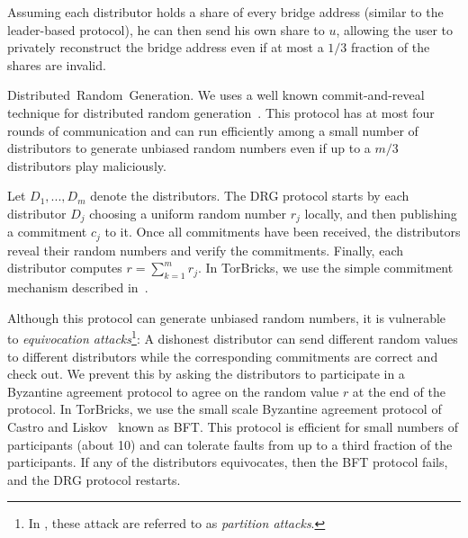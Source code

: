 \documentclass[USenglish,oneside,twocolumn]{article}
\newcommand{\bricks}{}
\def\bricks/{\textsf{\sfsize \mbox{TorBricks}}}
\newcommand{\sfsize}{\fontsize{0.68\baselineskip}{0.68\baselineskip}\selectfont}
\newcommand{\sans}[1]{\textsf{\sfsize \mbox{#1}}}
\newcommand{\para}[1]{\vspace{0.85em} \noindent \sans{{\mbox{#1}}}}
\begin{document}
Assuming each distributor holds a share of every bridge address (similar to the leader-based protocol), he can then send his own share to $u$, allowing the user to privately reconstruct the bridge address even if at most a $1/3$ fraction of the shares are invalid.

\para{Distributed Random Generation.} 
We uses a well known commit-and-reveal technique for distributed random generation~\cite{cryptoeprint:2015:366, Tor:DRG:Proposal:2015}. This protocol has at most four rounds of communication and can run efficiently among a small number of distributors to generate unbiased random numbers even if up to a $m/3$ distributors play maliciously.

Let $D_1,...,D_m$ denote the distributors. The DRG protocol starts by each distributor $D_j$ choosing a uniform random number $r_j$ locally, and then publishing a commitment $c_j$ to it. Once all commitments have been received, the distributors reveal their random numbers and verify the commitments. Finally, each distributor computes $r = \sum_{k=1}^m{r_j}$. In \bricks/, we use the simple commitment mechanism described in~\cite{Tor:DRG:Proposal:2015}.

Although this protocol can generate unbiased random numbers, it is vulnerable to \emph{equivocation attacks}\footnote{In \cite{Tor:DRG:Proposal:2015}, these attack are referred to as \emph{partition attacks}.}: A dishonest distributor can send different random values to different distributors while the corresponding commitments are correct and check out. We prevent this by asking the distributors to participate in a Byzantine agreement protocol to agree on the random value $r$ at the end of the protocol. In \bricks/, we use the small scale Byzantine agreement protocol of Castro and Liskov~\cite{CL1} known as BFT. This protocol is efficient for small numbers of participants (about 10) and can tolerate faults from up to a third fraction of the participants. If any of the distributors equivocates, then the BFT protocol fails, and the DRG protocol restarts. 
\end{document}
